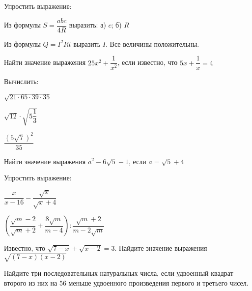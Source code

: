 \begin{listofex}
	\item Упростить выражение:
	\begin{enumcols}[itemcolumns=1]
		\item {}
		\item {}
	\end{enumcols}
	\item Из формулы \( S=\dfrac{abc}{4R} \) выразить: а) \( c \); б) \( R \)
	\item Из формулы \( Q=I^2Rt \) выразить \( I \). Все величины положительны.
	\item Найти значение выражения \( 25x^2+\dfrac{1}{x^2} \), если известно, что \( 5x+\dfrac{1}{x}=4 \)
	\item {}
	\item {}
	\item Вычислить:
	\begin{enumcols}[itemcolumns=3]
		\item \( \sqrt{21\cdot65\cdot39\cdot35} \)
		\item \( \sqrt{12}\cdot\sqrt{5\dfrac{1}{3}} \)
		\item \( \dfrac{(5\sqrt{7})^2}{35} \)
	\end{enumcols}
	\item Найти значение выражения \( a^2-6\sqrt{5}-1 \), если \( a=\sqrt{5}+4 \)
	\item Упростить выражение:
	\begin{enumcols}[itemcolumns=2]
		\item \( \dfrac{x}{x-16}-\dfrac{\sqrt{x}}{\sqrt{x}+4} \)
		\item \( \left( \dfrac{\sqrt{m}-2}{\sqrt{m}+2}+\dfrac{8\sqrt{m}}{m-4} \right):\dfrac{\sqrt{m}+2}{m-2\sqrt{m}} \)
	\end{enumcols}
	\item Известно, что \( \sqrt{7-x}+\sqrt{x-2}=3 \). Найдите значение выражения \( \sqrt{(7-x)(x-2)} \)
	\item Найдите три последовательных натуральных числа, если удвоенный квадрат второго из
	них на \( 56 \) меньше удвоенного произведения первого и третьего чисел.
\end{listofex}